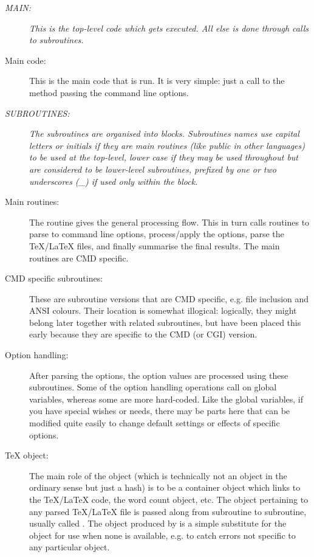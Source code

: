 \documentclass{article}
\begin{document}
\begin{description}
\item[\em MAIN:] \textit{This is the top-level code which gets executed. All else is done through calls to subroutines.}

\item[Main \TeXcount{} code:] This is the main code that is run. It is very simple: just a call to the method  passing the command line options.

\item[\em SUBROUTINES:] \textit{The subroutines are organised into blocks. Subroutines names use capital letters or initials if they are main routines (like public in other languages) to be used at the top-level, lower case if they may be used throughout but are considered to be lower-level subroutines, prefixed by one or two underscores (_) if used only within the block.}

\item[Main routines:] The  routine gives the general processing flow. This in turn calls routines to parse to command line options, process/apply the options, parse the \TeX/\LaTeX{} files, and finally summarise the final results. The main routines are CMD specific.

\item[CMD specific subroutines:] These are subroutine versions that are CMD specific, e.g. file inclusion and ANSI colours. Their location is somewhat illogical: logically, they might belong later together with related subroutines, but have been placed this early because they are specific to the CMD (or CGI) version.

\item[Option handling:] After parsing the options, the option values are processed using these subroutines. Some of the option handling operations call on global variables, whereas some are more hard-coded. Like the global variables, if you have special wishes or needs, there may be parts here that can be modified quite easily to change default settings or effects of specific options.

\item[\TeX{} object:] The main role of the  object (which is technically not an object in the ordinary sense but just a hash) is to be a container object which links to the \TeX/\LaTeX{} code, the word count object, etc. The  object pertaining to any parsed \TeX/\LaTeX{} file is passed along from subroutine to subroutine, usually called . The  object produced by  is a simple substitute for the  object for use when none is available, e.g. to catch errors not specific to any particular  object. 


\end{description}
\end{document}

